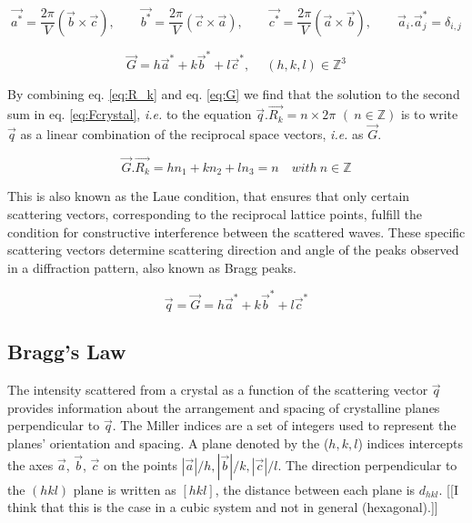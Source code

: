 \begin{equation}
    \vec{a^*}=\frac{2\pi}{V}(\vec{b}\times \vec{c}), \qquad
    \vec{b^*}=\frac{2\pi}{V}(\vec{c}\times \vec{a}), \qquad
    \vec{c^*}=\frac{2\pi}{V}(\vec{a}\times \vec{b}), \qquad
    \vec{a}_i . \vec{a}_j^* = \delta_{i,j}
\end{equation}

\begin{equation}
    \label{eq:G}
    \vec{G}=h\vec{a}^* + k\vec{b}^* + l\vec{c}^*, \quad \ (h,k,l) \in \mathbb{Z}^3
\end{equation}

By combining eq. \ref{eq:R_k} and eq. \ref{eq:G} we find that the solution to the second sum in eq. \ref{eq:Fcrystal}, {\color{DarkOrange}\textit{i.e.}} to the equation $\vec{q}.\vec{R_k} = n \times 2\pi$ $(\ n \in \mathbb{Z})$ is to write $\vec{q}$ as a linear combination of the reciprocal space vectors, {\color{DarkOrange}\textit{i.e.}} as $\vec{G}$.

\begin{equation}
    \label{eq:LaueCond}
    \vec{G} . \vec{R_k} = hn_1 + kn_2 + ln_3 = n \quad  with \ n \in \mathbb{Z}
\end{equation}

This is also known as the Laue condition, that ensures that only certain scattering vectors, corresponding to the reciprocal lattice points, fulfill the condition for constructive interference between the scattered waves.
These specific scattering vectors determine scattering direction and angle of the peaks observed in a diffraction pattern, also known as Bragg peaks.

\begin{equation}
    \vec{q} = \vec{G}  = h\vec{a}^* + k\vec{b}^* + l\vec{c}^*
\end{equation}

\subsection{Bragg's Law}

The intensity scattered from a crystal as a function of the scattering vector $\vec{q}$ provides information about the arrangement and spacing of crystalline planes perpendicular to $\vec{q}$.
The Miller indices are a set of integers used to represent the planes' orientation and spacing.
A plane denoted by the ($h, k, l$) indices intercepts the axes $\vec{a}$, $\vec{b}$, $\vec{c}$ on the points $|\vec{a}|/h, |\vec{b}|/k, |\vec{c}|/l$.
The direction perpendicular to the $(hkl)$ plane is written as $[hkl]$, the distance between each plane is $d_{hkl}$. {\color{DarkOrange}[[I think that this is the case in a cubic system and not in general (hexagonal).]]}

